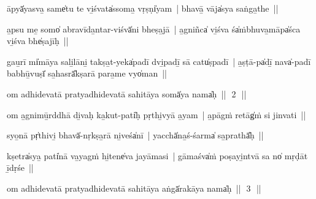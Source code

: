 \documentclass[parskip, DIV=14]{scrartcl}
\begin{document}
{\vspace{0.5cm}

āpyā̍yasva̱ same̍tu te vi̱śvata̍ssoma̱ vṛṣṇi̍yam~| bhavā̱ vāja̍sya saṅga̱the~||


a̱psu me̱ somo̍ abravīda̱ntar-viśvā̍ni bheṣa̱jā~| 
a̱gniñca̍ vi̱śva śa̍ṁbhuva̱māpa̍śca vi̱śva bhe̍ṣajīḥ~||


gau̱rī mi̍māya sali̱lāni̱ takṣa̱t-yeka̍padī dvi̱padī̱ sā catu̍ṣpadī~| 
a̱ṣṭā-pa̍dī̱ nava̍-padī babhū̱vuṣī̍ sa̱hasrā̎kṣarā para̱me vyo̍man~||


om adhidevatā pratyadhidevatā sahitāya somā̍ya॒ nama̍ḥ~||~\,2\,~||
\vspace{0.5cm}

om a̱gnimū̱rddhā di̱vaḥ ka̱kut-pati̍ḥ pṛthi̱vyā a̱yam~| a̱pāgṁ retāg̍ṁ si jinvati~||


syo̱nā pṛ̍thivi̱ bhavā̍-nṛkṣa̱rā ni̱veśa̍nī~| yacchā̍na̱ś-śarma̍ sa̱prathā̎ḥ~||


kṣetra̍sya̱ pati̍nā va̱yagṁ hi̱tene̍va jayāmasi~| gāmaśva̍ṁ poṣayi̱ntvā sa no̍ mṛḍāt ī̱dṛśe~||


om adhidevatā pratyadhidevatā sahitāya aṅgā̍rakāya॒ nama̍ḥ~||~\,3\,~||
\vspace{0.5cm}

}
\end{document}
